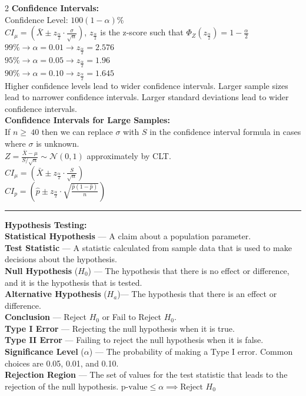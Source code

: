 \documentclass[10pt,letterpaper]{article}
\begin{document}
\begin{multicols}{2}
\textbf{Confidence Intervals:}\\
Confidence Level: $100(1-\alpha)\%$\\
$CI_\mu = (\bar{X} \pm z_{\frac{\alpha}{2}} \cdot \frac{\sigma}{\sqrt{n}})$, $z_{\frac{\alpha}{2}}$ is the z-score such that $\Phi_Z\left(z_{\frac{\alpha}{2}}\right) = 1 - \frac{\alpha}{2}$\\
$99\% \rightarrow \alpha = 0.01 \rightarrow z_{\frac{\alpha}{2}} = 2.576$\\
$95\% \rightarrow \alpha = 0.05 \rightarrow z_{\frac{\alpha}{2}} = 1.96$\\
$90\% \rightarrow \alpha = 0.10 \rightarrow z_{\frac{\alpha}{2}} = 1.645$\\      
Higher confidence levels lead to wider confidence intervals. Larger sample sizes lead to 
narrower confidence intervals. Larger standard deviations lead to wider confidence intervals.\\
\textbf{Confidence Intervals for Large Samples:}\\
If $n \geq ~40$ then we can replace $\sigma$ with $S$ in the confidence interval formula in cases where $\sigma$ is unknown.\\
$Z = \frac{\bar{X} - \mu}{S / \sqrt{n}} \sim \mathcal{N}(0, 1)$ approximately by CLT.\\
$CI_\mu = (\bar{X} \pm z_{\frac{\alpha}{2}} \cdot \frac{S}{\sqrt{n}})$\\
$CI_p = \left(\hat{p} \pm z_{\frac{\alpha}{2}} \cdot \sqrt{\frac{\hat{p}(1-\hat{p})}{n}}\right)$

\vspace{0.1cm}
\hrule
\vspace{0.1cm}

\textbf{Hypothesis Testing:}\\
\textbf{Statistical Hypothesis} --- A claim about a population parameter.\\
\textbf{Test Statistic} --- A statistic calculated from sample data that is used to make decisions about the hypothesis.\\
\textbf{Null Hypothesis} ($H_0$) --- The hypothesis that there is no effect or difference, and it is the hypothesis that is tested.\\
\textbf{Alternative Hypothesis} ($H_a$)--- The hypothesis that there is an effect or difference.\\
\textbf{Conclusion} --- Reject $H_0$ or Fail to Reject $H_0$.\\
\textbf{Type I Error} --- Rejecting the null hypothesis when it is true.\\
\textbf{Type II Error} --- Failing to reject the null hypothesis when it is false.\\
\textbf{Significance Level} ($\alpha$) --- The probability of making a Type I error. Common choices are 0.05, 0.01, and 0.10.\\
\textbf{Rejection Region} --- The set of values for the test statistic that leads to the rejection of the null hypothesis. $\text{p-value} \leq \alpha \implies \text{Reject } H_0$


\end{multicols}
\end{document}
